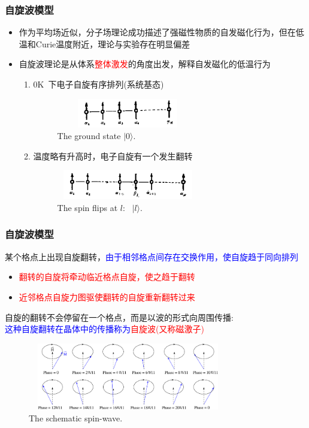 \documentclass[cjk,slidestop,compress,mathserif,blue]{beamer}
\begin{document}
\frame
{
	\frametitle{自旋波模型}
	\begin{itemize}
		\item 作为平均场近似，分子场理论成功描述了强磁性物质的自发磁化行为，但在低温和\textrm{Curie}温度附近，理论与实验存在明显偏差
		\item 自旋波理论是从体系\textcolor{red}{整体激发}的角度出发，解释自发磁化的低温行为
			\begin{enumerate}
				\item 0\textrm{K~}下电子自旋有序排列(系统基态)
\begin{figure}[h!]
\centering
\includegraphics[height=0.50in,width=2.45in,viewport=10 10 600 150,clip]{Figures/Mag_spinwave-0.png}
\caption{\tiny \textrm{The ground state $|0\rangle$.}}%
\label{Mag_spinwave-0}
\end{figure}
				\item 温度略有升高时，电子自旋有一个发生翻转
\begin{figure}[h!]
\centering
\includegraphics[height=0.50in,width=2.45in,viewport=10 10 680 150,clip]{Figures/Mag_spinwave-1.png}
\caption{\tiny \textrm{The spin flips at $l$:~ $|l\rangle$.}}%
\label{Mag_spinwave-1}
\end{figure}
			\end{enumerate}
	\end{itemize}
}

\frame
{
	\frametitle{自旋波模型}
	某个格点上出现自旋翻转，\textcolor{blue}{由于相邻格点间存在交换作用，使自旋趋于同向排列}
	\begin{itemize}
		\item \textcolor{red}{翻转的自旋将牵动临近格点自旋，使之趋于翻转}
		\item \textcolor{red}{近邻格点自旋力图驱使翻转的自旋重新翻转过来}
	\end{itemize}
	自旋的翻转不会停留在一个格点，而是以波的形式向周围传播:\\
	\textcolor{blue}{这种自旋翻转在晶体中的传播称为}\textcolor{red}{自旋波(又称磁激子)}
\begin{figure}[h!]
\centering
\includegraphics[height=1.15in,width=3.45in,viewport=0 0 830 300,clip]{Figures/Mag_spinwave-2.png}
\caption{\tiny \textrm{The schematic spin-wave.}}%
\label{Mag_spinwave-2}
\end{figure}
}
\end{document}
